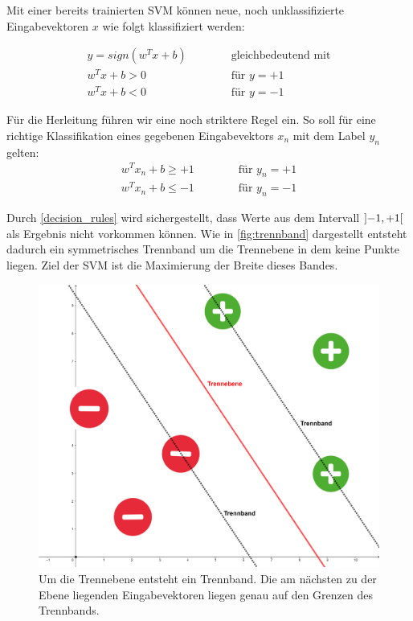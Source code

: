 \documentclass[a4paper,11pt,twoside]{scrreprt}
\begin{document}
Mit einer bereits trainierten \ac{SVM} können neue, noch unklassifizierte Eingabevektoren $x$ wie folgt klassifiziert werden:

\begin{subequations} \label{svm_classify1}
	\begin{alignat}{2}
		y = sign(w^{T} x + b)  & \qquad & \text{ gleichbedeutend mit} \\
		w^{T} x + b > 0 & & \text{ für } y = +1\\
		w^{T} x + b < 0 & & \text{ für } y = -1
	\end{alignat}
\end{subequations}


Für die Herleitung führen wir eine noch striktere Regel ein. So soll für eine richtige Klassifikation eines gegebenen Eingabevektors $x_{n}$ mit dem Label $y_{n}$ gelten:
\begin{subequations} \label{decision_rules}
	\begin{alignat}{2}
		w^{T} x_{n} + b \geq +1 & \qquad & \text{ für } y_{n} = +1\\
		w^{T} x_{n} + b \leq -1 & & \text{ für } y_{n} = -1
	\end{alignat}
\end{subequations}


Durch \autoref{decision_rules} wird sichergestellt, dass Werte aus dem Intervall $\interval[open]{-1}{+1}$ als Ergebnis nicht vorkommen können. Wie in \autoref{fig:trennband} dargestellt entsteht dadurch ein symmetrisches Trennband um die Trennebene in dem keine Punkte liegen. Ziel der \ac{SVM} ist die Maximierung der Breite dieses Bandes.\\

\begin{figure}[H]
	\centering
	\includegraphics[width = 12cm]{assets/trennband.png}
	\caption{Um die Trennebene entsteht ein Trennband. Die am nächsten zu der Ebene liegenden Eingabevektoren liegen genau auf den Grenzen des Trennbands.}
	\label{fig:trennband}
\end{figure}
\end{document}

